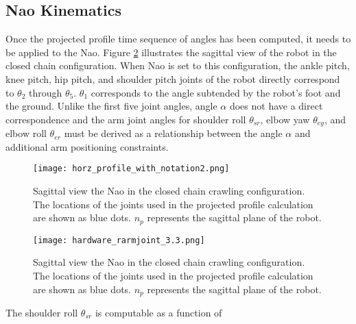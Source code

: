 \subsection{Nao Kinematics}
Once the projected profile time sequence of angles has been computed, it needs to be applied to the Nao.
Figure \ref{fig:nao_pp_view1} illustrates the sagittal view of the robot in the closed chain configuration.
When Nao is set to this configuration, the ankle pitch, knee pitch, hip pitch, and shoulder pitch joints 
of the robot directly correspond to $\theta_2$ through $\theta_5$. $\theta_1$ corresponds to the angle
subtended by the robot's foot and the ground. Unlike the first five joint angles, angle $\alpha$ does not have a
direct correspondence and the arm joint angles for shoulder roll $\theta_{sr}$, elbow yaw $\theta_{ey}$, 
and elbow roll $\theta_{er}$ must be derived as a relationship between the angle $\alpha$ and additional
arm positioning constraints.

\begin{figure}
	\texttt{[image: horz\_profile\_with\_notation2.png]}
  	\caption{Sagittal view the Nao in the closed chain crawling configuration. 
  				The locations of the joints used in the projected profile calculation are shown as blue dots. 
  				$n_p$ represents the sagittal plane of the robot.
  			}
  	\label{fig:nao_pp_view1}
\end{figure}

\begin{figure}
	\texttt{[image: hardware\_rarmjoint\_3.3.png]}
  	\caption{Sagittal view the Nao in the closed chain crawling configuration. 
  				The locations of the joints used in the projected profile calculation are shown as blue dots. 
  				$n_p$ represents the sagittal plane of the robot.
  			}
  	\label{fig:nao_pp_view1}
\end{figure}


The shoulder roll $\theta_{sr}$ is computable as a function of 


